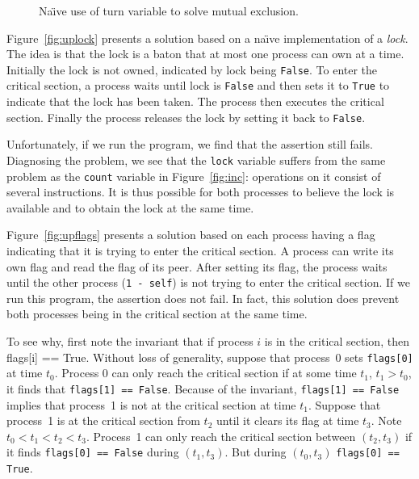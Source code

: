 \documentclass{report}
\newenvironment{code}{
\tcolorbox
}{
\endtcolorbox
}
\begin{document}
\begin{figure}
\begin{code}

\end{code}
\caption{Na\"{\i}ve use of turn variable to solve mutual exclusion.}
\label{fig:upturn}
\end{figure}

Figure~\ref{fig:uplock} presents a solution based on a na\"{\i}ve implementation
of a \emph{lock}.
The idea is that the lock is a baton that at most one process can own at
a time.
Initially the lock is not owned, indicated by lock being \texttt{False}.
To enter the critical section, a process waits until lock is \texttt{False}
and then sets it to \texttt{True} to indicate that the lock has been taken.
The process then executes the critical section.  Finally the process
releases the lock by setting it back to \texttt{False}.

Unfortunately, if we run the program, we find that the assertion still
fails.  Diagnosing the problem, we see that the \texttt{lock} variable
suffers from the same problem as the \texttt{count} variable
in Figure~\ref{fig:inc}: operations
on it consist of several instructions.  It is thus possible
for both processes to believe the lock is available and to obtain the lock
at the same time.

Figure~\ref{fig:upflags} presents a solution based on each process having
a flag indicating that it is trying to enter the critical section.
A process can write its own flag and read the flag of its peer.
After setting its flag, the process waits until the other process
(\texttt{1 - self}) is not trying to enter the critical section.
If we run this program, the assertion does not fail.  In fact, this
solution does prevent both processes being in the critical section at
the same time.

To see why, first note the invariant that if process $i$ is in the
critical section, then flags[i] == True.
Without loss of generality,
suppose that process~0 sets \texttt{flags[0]} at time $t_0$.
Process 0 can only reach the critical section if at some time $t_1$,
$t_1 > t_0$, it finds that \texttt{flags[1] == False}.
Because of the invariant, \texttt{flags[1] == False} implies that
process~1 is not at the critical section at time $t_1$.
Suppose that process~1 is at the critical section from $t_2$ until
it clears its flag at time $t_3$.  Note $t_0 < t_1 < t_2 < t_3$.
Process~1 can only reach the critical section between $(t_2, t_3)$
if it finds \texttt{flags[0] == False} during $(t_1, t_3)$.  But
during $(t_0, t_3)$ \texttt{flags[0] == True}.
\end{document}

